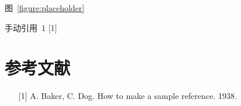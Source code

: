 {图~\ref{figure:placeholder}

手动引用~1 {[}1{]}

\section{参考文献}

\begin{itemize}
\item [{[}1{]}] A. Baker, C. Dog. How to make a sample reference. 1938.
\end{itemize}
}

